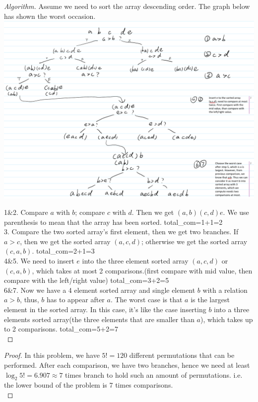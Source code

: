 \documentclass[12pt]{article}
\begin{document}
\begin{proof}[Algorithm]
	Assume we need to sort the array descending order. The graph below has shown the worst occasion.\\
		\includegraphics[scale=0.25]{adv_1.png}
		
	1\&2. Compare $a$ with $b$; compare $c$ with $d$. Then we get $(a,b)(c,d)e$. We use parenthesis to mean that the array has been sorted. total\_com=1+1=2\\
	
	3. Compare the two sorted array's first element, then we get two branches. If $a>c$, then we get the sorted array $(a,c,d)$; otherwise we get the sorted array $(c,a,b)$. total\_com=2+1=3\\
	
	4\&5. We need to insert $e$ into the three element sorted array $(a,c,d)$ or $(c,a,b)$, which takes at most 2 comparisons.(first compare with mid value, then compare with the left/right value) total\_com=3+2=5\\
	
	6\&7. Now we have a 4 element sorted array and single element $b$ with a relation $a>b$, thus, $b$ has to appear after $a$. The worst case is that $a$ is the largest element in the sorted array. In this case, it's like the case inserting $b$ into a three elements sorted array(the three elements that are smaller than $a$), which takes up to 2 comparisons. total\_com=5+2=7\\
\end{proof}
\begin{proof}
	In this problem, we have $5!=120$ different permutations that can be performed. After each comparison, we have two branches, hence we need at least $\log_2{5!}=6.907 \approx7$ times branch to hold such an amount of permutations. i.e. the lower bound of the problem is 7 times comparisons.\\ 
\end{proof}
\end{document}
